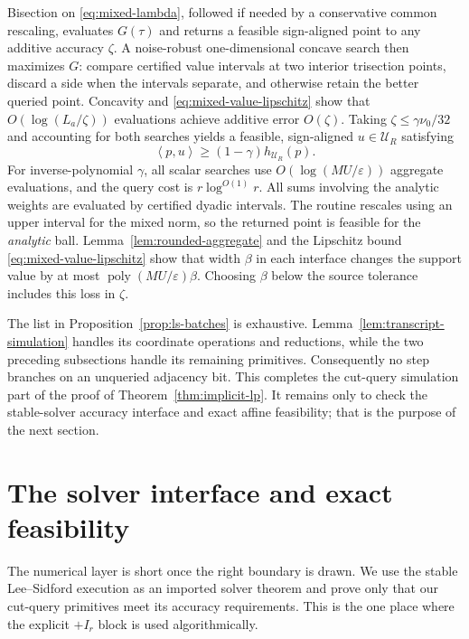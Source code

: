 \documentclass[11pt]{article}
\theoremstyle{definition}
\newcommand{\eps}{\varepsilon}
\newcommand{\poly}{\operatorname{poly}}
\newcommand{\ip}[2]{\left\langle #1,#2\right\rangle}
\begin{document}
Bisection on \eqref{eq:mixed-lambda}, followed if needed by a conservative
common rescaling, evaluates $G(\tau)$ and returns a feasible sign-aligned point
to any additive accuracy $\zeta$.  A noise-robust one-dimensional concave
search then maximizes $G$: compare certified value intervals at two interior
trisection points, discard a side when the intervals separate, and otherwise
retain the better queried point.  Concavity and
\eqref{eq:mixed-value-lipschitz} show that
$O(\log(L_a/\zeta))$ evaluations achieve additive error $O(\zeta)$.
Taking $\zeta\le\gamma\nu_0/32$ and accounting for both searches yields a
feasible, sign-aligned $u\in\mathcal U_R$ satisfying
\begin{equation}\label{eq:relative-mixed-support}
        \ip{p}{u}\ge(1-\gamma)h_{\mathcal U_R}(p).
\end{equation}
For inverse-polynomial $\gamma$, all scalar searches use $O(\log(MU/\eps))$
aggregate evaluations, and the query cost is $r\log^{O(1)}r$.
All sums involving the analytic weights are evaluated by certified dyadic
intervals.  The routine rescales using an upper interval for the mixed norm,
so the returned point is feasible for the \emph{analytic} ball.
Lemma~\ref{lem:rounded-aggregate} and the Lipschitz
bound \eqref{eq:mixed-value-lipschitz} show that width $\beta$ in each
interface changes the support value by at most
$\poly(MU/\eps)\beta$.  Choosing $\beta$ below the source tolerance includes
this loss in $\zeta$.

The list in Proposition~\ref{prop:ls-batches} is exhaustive.
Lemma~\ref{lem:transcript-simulation} handles its coordinate operations and
reductions, while the two preceding subsections handle its remaining
primitives.  Consequently no step branches on an unqueried adjacency bit.
This completes the cut-query simulation part of the proof of
Theorem~\ref{thm:implicit-lp}.  It remains only to check the stable-solver
accuracy interface and exact affine feasibility; that is the purpose of the
next section.

\section{The solver interface and exact feasibility}
\label{sec:numerics}

The numerical layer is short once the right boundary is drawn.  We use the
stable Lee--Sidford execution as an imported solver theorem and prove only
that our cut-query primitives meet its accuracy requirements.  This is the
one place where the explicit $+I_r$ block is used algorithmically.
\end{document}
